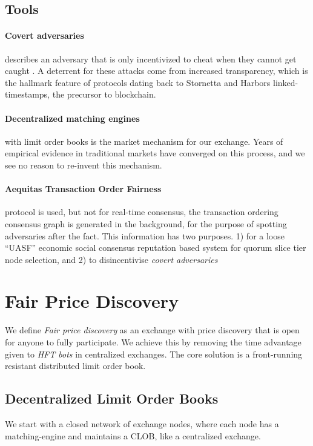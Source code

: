 \documentclass[12pt]{article}
\begin{document}
\subsection {Tools}
\paragraph{Covert adversaries} describes an adversary that is only incentivized to cheat when they cannot get caught \cite{Aumann}. A deterrent for these attacks come from increased transparency, which is the hallmark feature of protocols dating back to Stornetta and Harbors linked-timestamps, the precursor to blockchain. \cite{10.1007/3-540-38424-3_32} 

\paragraph{Decentralized matching engines} with limit order books is the market mechanism for our exchange. Years of empirical evidence in traditional markets have converged on this process, and we see no reason to re-invent this mechanism. 

\paragraph{Aequitas Transaction Order Fairness} protocol is used, but not for real-time consensus, the transaction ordering consensus graph is generated in the background, for the purpose of spotting adversaries after the fact. This information has two purposes. 1) for a loose ``UASF'' economic social consensus reputation based system for quorum slice tier node selection, and 2) to disincentivise \emph{covert adversaries}  

\section{Fair Price Discovery} 
We define \emph{Fair price discovery} as an exchange with price discovery that is open for anyone to fully participate. We achieve this by removing the time advantage given to \emph{HFT bots} in centralized exchanges. The core solution is a front-running resistant distributed limit order book.  

\subsection*{Decentralized Limit Order Books}
We start with a closed network of exchange nodes, where each node has a matching-engine and maintains a CLOB, like a centralized exchange. 
\end{document}
